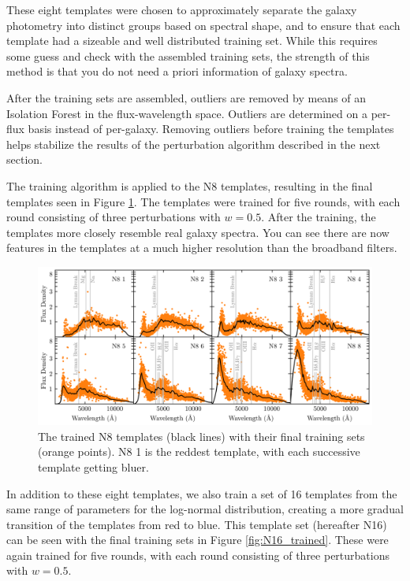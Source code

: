 These eight templates were chosen to approximately separate the galaxy photometry into distinct groups based on spectral shape, and to ensure that each template had a sizeable and well distributed training set. 
While this requires some guess and check with the assembled training sets, the strength of this method is that you do not need a priori information of galaxy spectra.

After the training sets are assembled, outliers are removed by means of an Isolation Forest in the flux-wavelength space. 
Outliers are determined on a per-flux basis instead of per-galaxy. 
Removing outliers before training the templates helps stabilize the results of the perturbation algorithm described in the next section.

The training algorithm is applied to the N8 templates, resulting in the final templates seen in Figure \ref{fig:N8_trained}. 
The templates were trained for five rounds, with each round consisting of three perturbations with $w=0.5$. 
After the training, the templates more closely resemble real galaxy spectra. 
You can see there are now features in the templates at a much higher resolution than the broadband filters. 

\begin{figure}
    \centering
    \includegraphics{figures/N8_trained.png}
    \caption{The trained N8 templates (black lines) with their final training sets (orange points). N8 1 is the reddest template, with each successive template getting bluer. }
    \label{fig:N8_trained}
\end{figure}

In addition to these eight templates, we also train a set of 16 templates from the same range of parameters for the log-normal distribution, creating a more gradual transition of the templates from red to blue. 
This template set (hereafter N16) can be seen with the final training sets in Figure \ref{fig:N16_trained}. 
These were again trained for five rounds, with each round consisting of three perturbations with $w=0.5$. 

